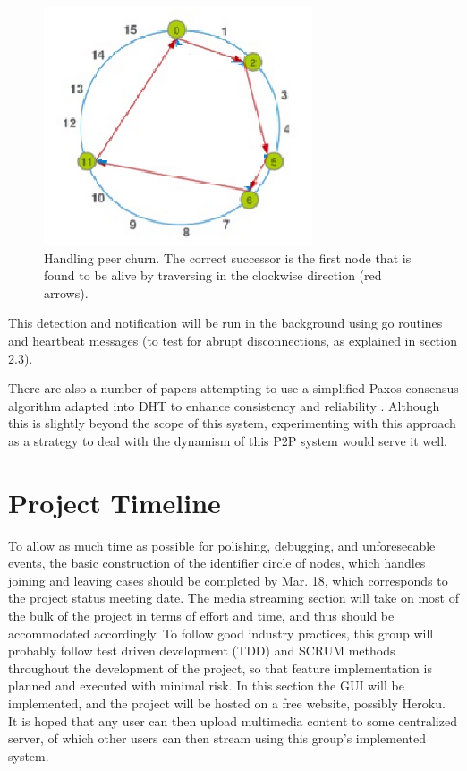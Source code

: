 \documentclass[fleqn,24pt]{SelfArx} %
\begin{document}
\begin{figure}[!htb]
\includegraphics{stabilize1.png}
\caption{\label{family}Handling peer churn. The correct successor is the first node that is found to be alive by traversing in the clockwise direction (red arrows).}
\label{5}
\end{figure}

This detection and notification will be run in the background using go routines and heartbeat messages (to test for abrupt disconnections, as explained in section 2.3).

There are also a number of papers attempting to use a simplified Paxos consensus algorithm adapted into DHT to enhance consistency and reliability \cite{2} \cite{1}. Although this is slightly beyond the scope of this system, experimenting with this approach as a strategy to deal with the dynamism of this P2P system would serve it well.

\section{Project Timeline}

To allow as much time as possible for polishing, debugging, and unforeseeable events, the basic construction of the identifier circle of nodes, which handles joining and leaving cases should be completed by Mar. 18, which corresponds to the project status meeting date. The media streaming section will take on most of the bulk of the project in terms of effort and time, and thus should be accommodated accordingly. To follow good industry practices, this group will probably follow test driven development (TDD) and SCRUM methods throughout the development of the project, so that feature implementation is planned and executed with minimal risk. In this section the GUI will be implemented, and the project will be hosted on a free website, possibly Heroku. It is hoped that any user can then upload multimedia content to some centralized server, of which other users can then stream using this group's implemented system.
\end{document}
